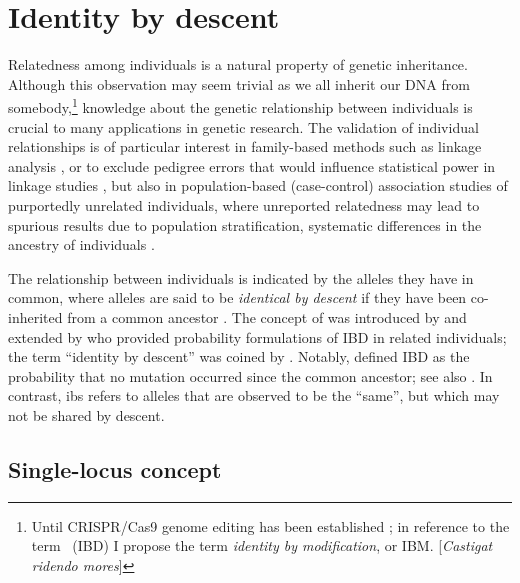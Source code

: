 %
\section{Identity by descent}
\label{sec:ibd_definition}
%

Relatedness among individuals is a natural property of genetic inheritance.
Although this observation may seem trivial as we all inherit our DNA from somebody,\footnote{Until CRISPR/Cas9 genome editing has been established \citep[\eg see][]{Cai:2016km}; in reference to the term \emph{}~(IBD) I propose the term \emph{identity by modification}, or IBM. {\color{oxgray}[\textit{Castigat ridendo mores}]}} knowledge about the genetic relationship between individuals is crucial to many applications in genetic research.
The validation of individual relationships is of particular interest in family-based methods such as linkage analysis \citep{Purcell:2007dg,Albrechtsen:2009cb}, or to exclude pedigree errors that would influence statistical power in linkage studies \citep{Boehnke:1997ku}, but also in population-based (case-control) association studies of purportedly unrelated individuals, where unreported relatedness may lead to spurious results due to population stratification, \ie systematic differences in the ancestry of individuals \citep{Freedman:2004dk,Voight:2005cr}.

The relationship between individuals is indicated by the alleles they have in common, where  alleles are said to be \emph{identical by descent} if they have been co-inherited from a common ancestor \citep{Thompson:1974fi,Thompson:1975uu}.
The concept of  was introduced by \citet{cotterman1940calculus} and extended by \citet{malecot1948mathematics} who provided probability formulations of IBD in related individuals; the term ``identity by descent'' was coined by \citet{crow1954}.
Notably, \citet{malecot1948mathematics} defined IBD as the probability that no mutation occurred since the common ancestor; see also \citet{Slatkin:2008by}.
In contrast, \gls{ibs} refers to alleles that are observed to be the ``same'', but which may not be shared by descent.

%
\subsection{Single-locus concept}
%


